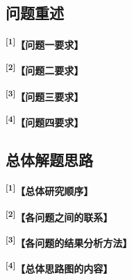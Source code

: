 \documentclass[UTF8,a4paper,12pt,fontset=fandol]{ctexart}
\newif\ifDraftAid
\newcommand{\ph}[1]{\textbf{\color{phg}【#1】}}
\newcommand{\detail}[1]{%
  \ifDraftAid\textnormal{\color{detailg}\small\,（参考写法：#1）}\fi}
\newcommand{\PHD}[2]{\ph{#1}\detail{#2}}
\newcommand{\SN}[1]{\textsuperscript{\color{noteg}\bfseries[#1]}}
\newcommand{\Note}[2]{\par\noindent\textbf{[#1]}\ #2}
\newcommand{\Annotated}[2]{%
\ifDraftAid
\noindent\begin{minipage}[t]{0.735\linewidth}\vspace{0pt}#1\end{minipage}\hfill
\begin{minipage}[t]{0.235\linewidth}\vspace{0pt}\footnotesize\color{noteg}\raggedright
\begin{tcolorbox}[colback=notebg,colframe=ruleg,boxrule=0.35pt,arc=1mm,left=1.2mm,right=1.2mm,top=1mm,bottom=1mm]
#2
\end{tcolorbox}\end{minipage}
\else
#1
\fi
}
\numberwithin{figure}{section}
\numberwithin{table}{section}
\begin{document}
\subsection{问题重述}
\Annotated{
\SN{1}\PHD{问题一要求}{基于上述研究背景，本文需要完成以下问题。问题一：从〔数据或资料〕中〔选取部分数据或对象〕，根据〔相关原理〕对〔数据〕进行分析，并提取出〔整体数据集的特征或指标〕；在提取时需要考虑所提取〔特征或指标〕在〔目标场景〕中是否适用，以更好地完成〔后续任务〕。}

\par\medskip
\SN{2}\PHD{问题二要求}{问题二：根据问题一提取的〔特征或指标〕，将〔数据集〕划分为训练集和测试集，建立数学模型，对〔研究对象〕进行〔分类、预测或评价〕，然后对结果进行分析和评价。}

\par\medskip
\SN{3}\PHD{问题三要求}{问题三：根据问题二建立的〔模型〕，分析〔对象A与对象B〕的相同和不同特征，使用〔相应方法〕建立数学模型，完成对〔目标对象中未知信息〕的〔任务〕，展示评定结果，同时展示〔迁移或推广结果〕并对其进行分析。}

\par\medskip
\SN{4}\PHD{问题四要求}{问题四：根据问题三中建立的〔目标模型〕，结合〔方法的过程和特点〕，考虑〔研究对象的特点和原理〕，说明〔题目要求解释或分析的内容〕，并给出〔题目明确要求的结论〕。}
}{
\Note{1}{问题重述以简洁为主，用“问题一：……”“问题二：……”逐条说明即可。}
\Note{2}{若问题三建立在问题二结果之上，应在这里提前说明。}
\Note{3}{问题三相较问题二增加的条件要写具体，便于后文说明为什么需要调整模型。}
\Note{4}{问题四按题目要求说明需要得到的分析结论或结果。}
}

\subsection{总体解题思路}
\Annotated{
\SN{1}\PHD{总体研究顺序}{本文的总体解题思路如图〔编号〕所示。本文首先对题目数据进行整理和分析，在此基础上完成问题一的〔主要任务〕；随后利用问题一结果建立问题二模型；问题三在前述模型基础上作进一步研究；最后结合前三问结果完成问题四。}

\par\medskip
\SN{2}\PHD{各问题之间的联系}{其中，问题一得到的〔特征、指标或数据集〕直接作为问题二的输入；问题二所得〔模型或参数〕作为问题三研究的基础；问题三得到的〔结果〕再用于问题四的进一步分析。各问题之间相互衔接，避免了相互割裂。}

\par\medskip
\SN{3}\PHD{各问题的结果分析方法}{在各问题求解过程中，分别结合相应方法分析结果：问题一主要考察〔特征或指标是否合理〕，问题二通过〔评价指标或交叉验证〕比较模型，问题三采用〔消融、灵敏度或对照实验〕分析改进效果，问题四结合〔实际规律或题目要求〕讨论结果。}

\par\medskip
\SN{4}\PHD{总体思路图的内容}{总体思路图主要给出各问题的先后关系和主要方法，例如“〔原始数据〕—〔问题一处理〕—〔问题二建模〕—〔问题三进一步研究〕—〔问题四分析〕”。具体公式和参数在相应章节中说明，不必全部放入流程图。}
}{
\Note{1}{总体思路先按问题顺序说明主要工作，再补充关键方法。}
\Note{2}{问题之间的联系最好写到具体数据、特征或模型。}
\Note{3}{各问的结果分析方法应与所建立的模型相对应。}
\Note{4}{流程图主干越清楚越好，不要塞满所有算法名。}
}
\end{document}
